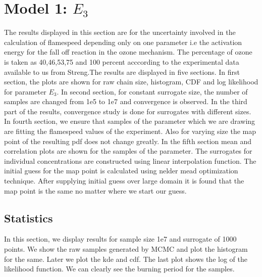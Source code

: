 \section{Model 1: $E_3$}

The results displayed in this section are for the uncertainty involved in the calculation of flamespeed depending only on one parameter i.e the activation energy for the fall off reaction in the ozone mechanism. The percentage of ozone is taken as 40,46,53,75 and 100  percent acccording to the experimental data available to us from Streng\cite{Streng}.The results are displayed in five sections. In first section, the plots are shown for raw chain size, histogram, CDF and log likelihood for parameter $E_3$. In second section, for constant surrogate size, the number of samples are changed from 1e5 to 1e7 and convergence is observed. In the third part of the results, convergence study is done for surrogates with different sizes. In fourth section, we ensure that samples of the parameter which we are drawing are fitting the flamespeed values of the experiment. Also for varying size the map point of the resulting pdf does not change greatly. In the fifth section mean and correlation plots are shown for the samples of the parameter. The surrogates for individual concentrations are constructed using linear interpolation function. The initial guess for the map point is calculated using nelder mead optimization technique. After supplying initial guess over large domain it is found that the map point is the same no matter where we start our guess. 

\subsection{ Statistics }

\noindent In this section, we display results for sample size 1e7 and surrogate of 1000 points. We show the raw samples generated by MCMC and plot the histogram for the same. Later we plot the kde and cdf. The last plot shows the log of the likelihood function. We can clearly see the burning period for the samples. 

